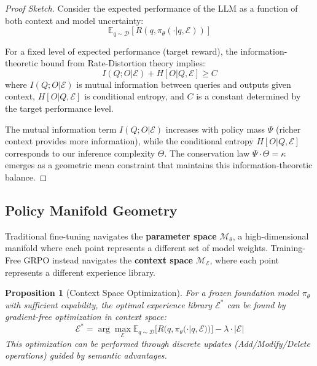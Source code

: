 \documentclass[11pt,a4paper]{article}
\newtheorem{proposition}{Proposition}
\begin{document}
\begin{proof}[Proof Sketch]
Consider the expected performance of the LLM as a function of both context and model uncertainty:
\begin{equation}
\mathbb{E}_{q \sim \mathcal{D}}[R(q, \pi_\theta(\cdot | q, \mathcal{E}))]
\end{equation}

For a fixed level of expected performance (target reward), the information-theoretic bound from Rate-Distortion theory \cite{cover1999elements} implies:
\begin{equation}
I(Q; O | \mathcal{E}) + H[O | Q, \mathcal{E}] \geq C
\end{equation}
where $I(Q; O | \mathcal{E})$ is mutual information between queries and outputs given context, $H[O | Q, \mathcal{E}]$ is conditional entropy, and $C$ is a constant determined by the target performance level.

The mutual information term $I(Q; O | \mathcal{E})$ increases with policy mass $\Psi$ (richer context provides more information), while the conditional entropy $H[O | Q, \mathcal{E}]$ corresponds to our inference complexity $\Theta$. The conservation law $\Psi \cdot \Theta = \kappa$ emerges as a geometric mean constraint that maintains this information-theoretic balance.
\end{proof}

\subsection{Policy Manifold Geometry}

Traditional fine-tuning navigates the \textbf{parameter space} $\mathcal{M}_\theta$, a high-dimensional manifold where each point represents a different set of model weights. Training-Free GRPO instead navigates the \textbf{context space} $\mathcal{M}_\mathcal{E}$, where each point represents a different experience library.

\begin{proposition}[Context Space Optimization]
For a frozen foundation model $\pi_\theta$ with sufficient capability, the optimal experience library $\mathcal{E}^*$ can be found by gradient-free optimization in context space:
\begin{equation}
\mathcal{E}^* = \arg\max_{\mathcal{E}} \mathbb{E}_{q \sim \mathcal{D}}[R(q, \pi_\theta(\cdot | q, \mathcal{E}))] - \lambda \cdot |\mathcal{E}|
\end{equation}
This optimization can be performed through discrete updates (Add/Modify/Delete operations) guided by semantic advantages.
\end{proposition}
\end{document}
